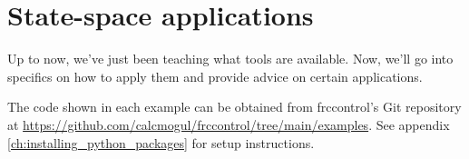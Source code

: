 
\chapter{State-space applications}

Up to now, we've just been teaching what tools are available. Now, we'll go into
specifics on how to apply them and provide advice on certain applications.

The code shown in each example can be obtained from frccontrol's Git repository
at \url{https://github.com/calcmogul/frccontrol/tree/main/examples}. See
appendix \ref{ch:installing_python_packages} for setup instructions.

\renewcommand*{\chapterpath}{\partpath/state-space-applications}








